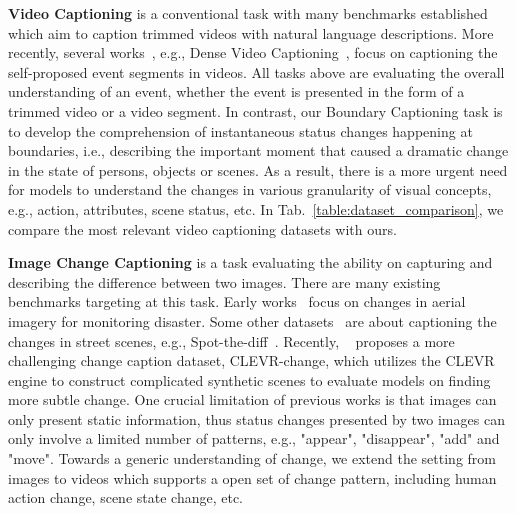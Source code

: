 \documentclass[runningheads]{llncs}
\begin{document}
\textbf{Video Captioning} is a conventional task with many benchmarks \cite{xu2016msr,chen-dolan-2011-collecting,wang2019vatex,krishna2017dense,zhou2018towards} established which aim to caption trimmed videos with natural language descriptions. More recently, several works~\cite{krishna2017dense,zhou2018towards,wang2021end,li2018jointly,iashin2020multi}, e.g., Dense Video Captioning~\cite{krishna2017dense}, focus on captioning the self-proposed event segments in videos. All tasks above are evaluating the overall understanding of an event, whether the event is presented in the form of a trimmed video or a video segment. In contrast, our Boundary Captioning task is to develop the comprehension of instantaneous status changes happening at boundaries, i.e., 
describing the important moment that caused a dramatic change in the state of persons, objects or scenes. As a result, there is a more urgent need for models to understand the changes in various granularity of visual concepts, e.g., action, attributes, scene status, etc. In Tab.~\ref{table:dataset_comparison}, we compare the most relevant video captioning datasets with ours.





\textbf{Image Change Captioning} is a task evaluating the ability on capturing and describing the difference between two images. There are many existing benchmarks targeting at this task. Early works~\cite{tian2013building,liu2017change} focus on changes in aerial imagery for monitoring disaster. Some other datasets~\cite{alcantarilla2018street,jhamtani2018learning} are about captioning the changes in street scenes, e.g., Spot-the-diff~\cite{jhamtani2018learning}. Recently, ~\cite{park2019robust} proposes a more challenging change caption dataset, CLEVR-change, which utilizes the CLEVR engine to construct complicated synthetic scenes to evaluate models on finding more subtle change.
One crucial limitation of previous works is that images can only present static information, thus status changes presented by two images can only involve a limited number of patterns, e.g., "appear", "disappear", "add" and "move". Towards a generic understanding of change, we extend the setting from images to videos which supports a open set of change pattern, including human action change, scene state change, etc. 
\end{document}
